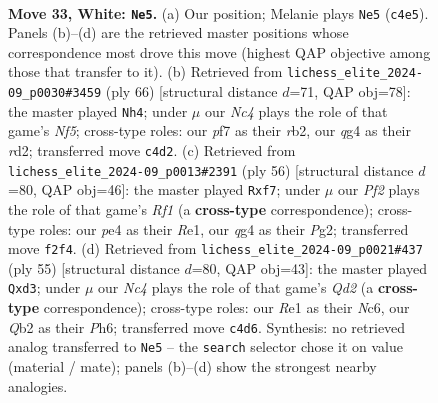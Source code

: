 \documentclass[11pt]{article}
\begin{document}
\clearpage

\begin{figure}[p]\centering
\begin{subfigure}{0.46\textwidth}\centering
\resizebox{\linewidth}{!}{%
\newchessgame
\chessboard[
  setfen={r3b1k1/p4pP1/8/pr6/2N1p1q1/PP6/1Q3P1K/R3R3 w - - 5 33},
  showmover=false,
  pgfstyle=straightmove, color=movearrow, markmove={c4-e5}
]}
\caption{}
\end{subfigure}\hfill
\begin{subfigure}{0.46\textwidth}\centering
\resizebox{\linewidth}{!}{%
\newchessgame
\chessboard[
  setfen={6k1/5pp1/7p/P1q1pN2/2p5/4PQ2/1r1r2P1/R1R3K1 w - - 2 34},
  showmover=false,
  pgfstyle=straightmove, color=movearrow, markmove={f5-h4}
]}
\caption{}
\end{subfigure}
\\[4pt]
\begin{subfigure}{0.46\textwidth}\centering
\resizebox{\linewidth}{!}{%
\newchessgame
\chessboard[
  setfen={3r3k/5pp1/2p1r3/1pq1P3/8/2P4P/1PQ3P1/4RR1K w - - 0 29},
  showmover=false,
  pgfstyle=straightmove, color=movearrow, markmove={f1-f7}
]}
\caption{}
\end{subfigure}\hfill
\begin{subfigure}{0.46\textwidth}\centering
\resizebox{\linewidth}{!}{%
\newchessgame
\chessboard[
  setfen={1rr3k1/p2q2p1/2n1pp1p/2P5/RP6/3BP2P/1Q1N2P1/2R3K1 b - - 0 28},
  showmover=false,
  pgfstyle=straightmove, color=movearrow, markmove={d7-d3}
]}
\caption{}
\end{subfigure}
\caption{\textbf{Move 33, White: \texttt{Ne5}.} (a) Our position; Melanie plays \texttt{Ne5} (\texttt{c4e5}). Panels (b)--(d) are the retrieved master positions whose correspondence most drove this move (highest QAP objective among those that transfer to it). (b) Retrieved from \texttt{lichess\_elite\_2024-09\_p0030\#3459} (ply 66) [structural distance $d$=71, QAP obj=78]: the master played \texttt{Nh4}; under $\mu$ our \emph{Nc4} plays the role of that game's \emph{Nf5}; cross-type roles: our \emph{p}f7 as their \emph{r}b2, our \emph{q}g4 as their \emph{r}d2; transferred move \texttt{c4d2}. (c) Retrieved from \texttt{lichess\_elite\_2024-09\_p0013\#2391} (ply 56) [structural distance $d$=80, QAP obj=46]: the master played \texttt{Rxf7}; under $\mu$ our \emph{Pf2} plays the role of that game's \emph{Rf1} (a \textbf{cross-type} correspondence); cross-type roles: our \emph{p}e4 as their \emph{R}e1, our \emph{q}g4 as their \emph{P}g2; transferred move \texttt{f2f4}. (d) Retrieved from \texttt{lichess\_elite\_2024-09\_p0021\#437} (ply 55) [structural distance $d$=80, QAP obj=43]: the master played \texttt{Qxd3}; under $\mu$ our \emph{Nc4} plays the role of that game's \emph{Qd2} (a \textbf{cross-type} correspondence); cross-type roles: our \emph{R}e1 as their \emph{N}c6, our \emph{Q}b2 as their \emph{P}h6; transferred move \texttt{c4d6}. Synthesis: no retrieved analog transferred to \texttt{Ne5} -- the \texttt{search} selector chose it on value (material / mate); panels (b)--(d) show the strongest nearby analogies.}
\label{fig:thought-m64}
\end{figure}
\end{document}
